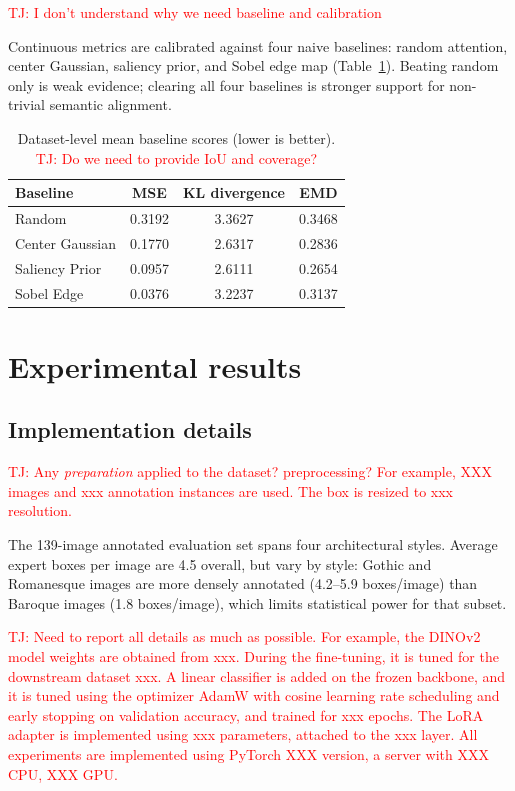 \documentclass[lineno,pdflatex,sn-mathphys-num]{sn-jnl}%
\theoremstyle{thmstyleone}%
\theoremstyle{thmstyletwo}%
\theoremstyle{thmstylethree}%
\begin{document}
\textcolor{red}{TJ: I don't understand why we need baseline and calibration}

Continuous metrics are calibrated against four naive baselines: random attention, center Gaussian, saliency prior, and Sobel edge map (Table~\ref{tab:baselines}). Beating random only is weak evidence; clearing all four baselines is stronger support for non-trivial semantic alignment.

\begin{table}[!h]
\centering
\caption{Dataset-level mean baseline scores (lower is better). \textcolor{red}{TJ: Do we need to provide IoU and coverage?}}
\label{tab:baselines}
\begin{tabular}{lccc}
\toprule
Baseline & MSE & KL divergence & EMD \\
\midrule
Random         & 0.3192 & 3.3627 & 0.3468 \\
Center Gaussian & 0.1770 & 2.6317 & 0.2836 \\
Saliency Prior & 0.0957 & 2.6111 & 0.2654 \\
Sobel Edge     & 0.0376 & 3.2237 & 0.3137 \\
\bottomrule
\end{tabular}%
\end{table}


\section{Experimental results} \label{section results}

\subsection{Implementation details}

\textcolor{red}{TJ: Any \textit{preparation} applied to the dataset? preprocessing? For example, XXX images and xxx annotation instances are used. The box is resized to xxx resolution. }

The 139-image annotated evaluation set spans four architectural styles. Average expert boxes per image are 4.5 overall, but vary by style: Gothic and Romanesque images are more densely annotated (4.2--5.9 boxes/image) than Baroque images (1.8 boxes/image), which limits statistical power for that
subset.

\textcolor{red}{TJ: Need to report all details as much as possible. For example, the DINOv2 model weights are obtained from xxx. During the fine-tuning, it is tuned for the downstream dataset xxx. A linear classifier is added on the frozen backbone, and it is tuned using the optimizer AdamW with cosine learning rate scheduling and early stopping on validation accuracy, and trained for xxx epochs. The LoRA adapter is implemented using xxx parameters, attached to the xxx layer. All experiments are implemented using PyTorch XXX version, a server with XXX CPU, XXX GPU. }
\end{document}

